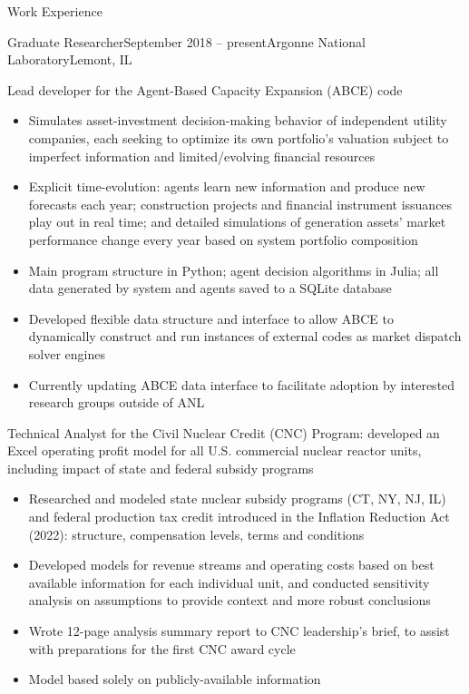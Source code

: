 \documentclass{resume} %
\begin{document}

\begin{rSection}{Work Experience}

\begin{rSubsection}{Graduate Researcher}{September 2018 -- present}{Argonne National Laboratory}{Lemont, IL}
  \setlength{\itemsep}{-5pt}
  \item Lead developer for the Agent-Based Capacity Expansion (ABCE) code
    \begin{itemize}
      \item Simulates asset-investment decision-making behavior of independent utility companies, each seeking to optimize its own portfolio's valuation subject to imperfect information and limited/evolving financial resources
      \item Explicit time-evolution: agents learn new information and produce new forecasts each year; construction projects and financial instrument issuances play out in real time; and detailed simulations of generation assets' market performance change every year based on system portfolio composition
      \item Main program structure in Python; agent decision algorithms in Julia; all data generated by system and agents saved to a SQLite database
      \item Developed flexible data structure and interface to allow ABCE to dynamically construct and run instances of external codes as market dispatch solver engines
      \item Currently updating ABCE data interface to facilitate adoption by interested research groups outside of ANL
    \end{itemize}

  \item Technical Analyst for the Civil Nuclear Credit (CNC) Program: developed an Excel operating profit model for all U.S. commercial nuclear reactor units, including impact of state and federal subsidy programs
  \begin{itemize}
    \item Researched and modeled state nuclear subsidy programs (CT, NY, NJ, IL) and federal production tax credit introduced in the Inflation Reduction Act (2022): structure, compensation levels, terms and conditions
    \item Developed models for revenue streams and operating costs based on best available information for each individual unit, and conducted sensitivity analysis on assumptions to provide context and more robust conclusions
    \item Wrote 12-page analysis summary report to CNC leadership's brief, to assist with preparations for the first CNC award cycle
    \item Model based solely on publicly-available information
  \end{itemize}


\end{rSubsection}
\end{rSection}
\end{document}

